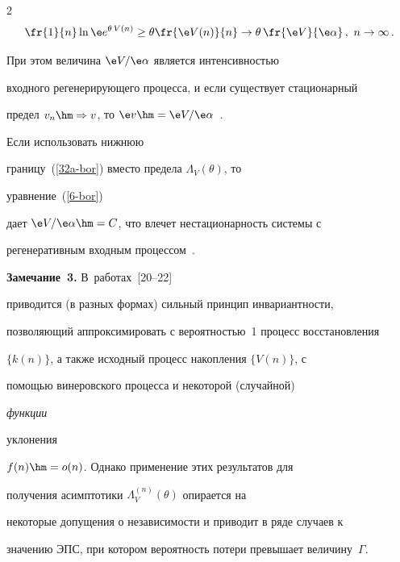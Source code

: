 \begin{multicols}{2}
\begin{equation}

\fr{1}{n}\ln \e e^{\theta\, V(n)}\ge \theta\fr {\e V(n)}{n}\to

\theta \,\fr{\e V}{\e\alpha}\,,\ n\to \infty\,. \label{32a-bor}

\end{equation}

При этом величина  $ \e V/\e \alpha $ является ин\-тен\-сив\-ностью

входного регенерирующего процесса, и если существует стационарный

предел $v_n\hm\Rightarrow v$, то $\e v\hm=\e V/\e \alpha$~\cite{Asmus}.

 Если  использовать  нижнюю

границу~(\ref{32a-bor}) вместо  предела $\Lambda_V(\theta)$, то

 уравнение~(\ref{6-bor})

дает   $\e V/\e \alpha\hm=C$, что  влечет нестационарность сис\-те\-мы с

регенеративным входным процессом~\cite{Questa04}.





\medskip



\noindent

\textbf{Замечание~3.}  В~работах~[20--22]

приводится (в разных формах) сильный принцип инвариантности,

позволяющий аппроксимировать с вероятностью~1 процесс восстановления

$\{k(n)\}$, а также  исходный процесс накопления $\{V(n)\}$, с

помощью винеровского процесса и некоторой (случайной) {\it функции

уклонения}  $f(n)\hm=o( n)$. Однако  применение этих результатов для

получения асимптотики $\Lambda_V^{(n)}(\theta)$ опирается на

некоторые допущения о независимости и приводит в ряде случаев к

значению ЭПС, при котором   вероятность потери превышает величину~$\Gamma$.



\begin{table}[b]\small

\vspace*{-12pt}

\begin{center}


\end{center}
\end{table}
\end{multicols}
